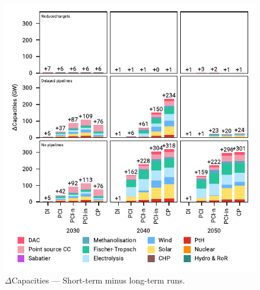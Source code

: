\documentclass[pdflatex,sn-nature]{sn-jnl}%
\theoremstyle{thmstyleone}%
\theoremstyle{thmstyletwo}%
\theoremstyle{thmstylethree}%
\begin{document}
\begin{appendices}
\begin{figure}[htbp]
  \centering
  \includegraphics{figures/capacities_overview_extended}
  \caption{$\Delta$Capacities --- Short-term minus long-term runs.}
  \label{fig:capacities_overview_extended}
\end{figure}


\end{appendices}
\end{document}
